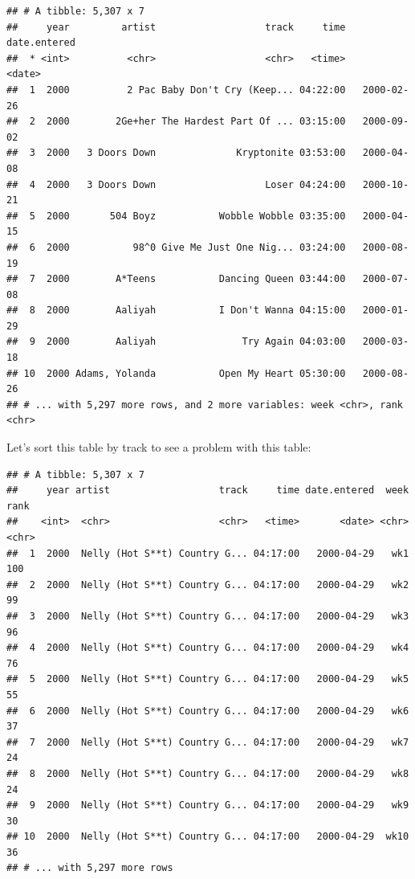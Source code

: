 \documentclass[12pt,]{book}
\newenvironment{Shaded}{\begin{snugshade}}{\end{snugshade}}
\newcommand{\KeywordTok}[1]{\textcolor[rgb]{0.13,0.29,0.53}{\textbf{#1}}}
\newcommand{\StringTok}[1]{\textcolor[rgb]{0.31,0.60,0.02}{#1}}
\newcommand{\OperatorTok}[1]{\textcolor[rgb]{0.81,0.36,0.00}{\textbf{#1}}}
\newcommand{\NormalTok}[1]{#1}
\theoremstyle{definition}
\theoremstyle{definition}
\theoremstyle{remark}
\begin{document}
\begin{verbatim}
## # A tibble: 5,307 x 7
##     year         artist                   track     time date.entered
##  * <int>          <chr>                   <chr>   <time>       <date>
##  1  2000          2 Pac Baby Don't Cry (Keep... 04:22:00   2000-02-26
##  2  2000        2Ge+her The Hardest Part Of ... 03:15:00   2000-09-02
##  3  2000   3 Doors Down              Kryptonite 03:53:00   2000-04-08
##  4  2000   3 Doors Down                   Loser 04:24:00   2000-10-21
##  5  2000       504 Boyz           Wobble Wobble 03:35:00   2000-04-15
##  6  2000           98^0 Give Me Just One Nig... 03:24:00   2000-08-19
##  7  2000        A*Teens           Dancing Queen 03:44:00   2000-07-08
##  8  2000        Aaliyah           I Don't Wanna 04:15:00   2000-01-29
##  9  2000        Aaliyah               Try Again 04:03:00   2000-03-18
## 10  2000 Adams, Yolanda           Open My Heart 05:30:00   2000-08-26
## # ... with 5,297 more rows, and 2 more variables: week <chr>, rank <chr>
\end{verbatim}

Let's sort this table by track to see a problem with this table:

\begin{Shaded}
\end{Shaded}

\begin{verbatim}
## # A tibble: 5,307 x 7
##     year artist                   track     time date.entered  week  rank
##    <int>  <chr>                   <chr>   <time>       <date> <chr> <chr>
##  1  2000  Nelly (Hot S**t) Country G... 04:17:00   2000-04-29   wk1   100
##  2  2000  Nelly (Hot S**t) Country G... 04:17:00   2000-04-29   wk2    99
##  3  2000  Nelly (Hot S**t) Country G... 04:17:00   2000-04-29   wk3    96
##  4  2000  Nelly (Hot S**t) Country G... 04:17:00   2000-04-29   wk4    76
##  5  2000  Nelly (Hot S**t) Country G... 04:17:00   2000-04-29   wk5    55
##  6  2000  Nelly (Hot S**t) Country G... 04:17:00   2000-04-29   wk6    37
##  7  2000  Nelly (Hot S**t) Country G... 04:17:00   2000-04-29   wk7    24
##  8  2000  Nelly (Hot S**t) Country G... 04:17:00   2000-04-29   wk8    24
##  9  2000  Nelly (Hot S**t) Country G... 04:17:00   2000-04-29   wk9    30
## 10  2000  Nelly (Hot S**t) Country G... 04:17:00   2000-04-29  wk10    36
## # ... with 5,297 more rows
\end{verbatim}
\end{document}
